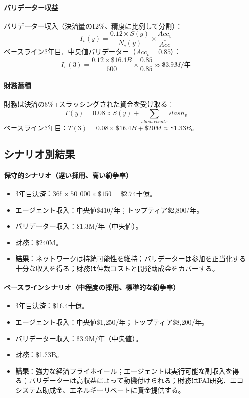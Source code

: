 \documentclass[11pt]{article}
\begin{document}
\paragraph{バリデーター収益} バリデーター収入（決済量の12\%、精度に比例して分割）：
\begin{equation}
I_v(y) = \frac{0.12 \times S(y)}{N_v(y)} \times \frac{Acc_v}{\bar{Acc}}
\end{equation}
ベースライン3年目、中央値バリデーター（$Acc_v = 0.85$）：
\begin{equation}
I_v(3) = \frac{0.12 \times \$16.4B}{500} \times \frac{0.85}{0.85} \approx \$3.9M \text{/年}
\end{equation}

\paragraph{財務蓄積} 財務は決済の8\%+スラッシングされた資金を受け取る：
\begin{equation}
T(y) = 0.08 \times S(y) + \sum_{slash \; events} slash_v
\end{equation}
ベースライン3年目：$T(3) = 0.08 \times \$16.4B + \$20M \approx \$1.33B$。

\subsection{シナリオ別結果}
\paragraph{保守的シナリオ（遅い採用、高い紛争率）}
\begin{itemize}[noitemsep]
  \item 3年目決済：$365 \times 50{,}000 \times \$150 = \$2.74$十億。
  \item エージェント収入：中央値\$410/年；トップティア\$2{,}800/年。
  \item バリデーター収入：\$1.3M/年（中央値）。
  \item 財務：\$240M。
  \item \textbf{結果}：ネットワークは持続可能性を維持；バリデーターは参加を正当化する十分な収入を得る；財務は仲裁コストと開発助成金をカバーする。
\end{itemize}

\paragraph{ベースラインシナリオ（中程度の採用、標準的な紛争率）}
\begin{itemize}[noitemsep]
  \item 3年目決済：\$16.4十億。
  \item エージェント収入：中央値\$1{,}250/年；トップティア\$8{,}200/年。
  \item バリデーター収入：\$3.9M/年（中央値）。
  \item 財務：\$1.33B。
  \item \textbf{結果}：強力な経済フライホイール；エージェントは実行可能な副収入を得る；バリデーターは高収益によって動機付けられる；財務はPAI研究、エコシステム助成金、エネルギーリベートに資金提供する。
\end{itemize}
\end{document}
